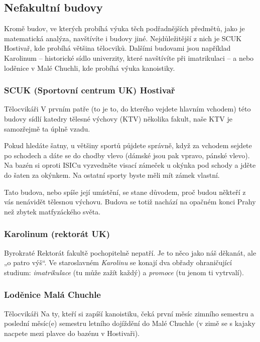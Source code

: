 \subsection{Nefakultní budovy}
Kromě budov, ve kterých probíhá výuka těch podřadnějších předmětů, jako je
matematická analýza, navštívíte i budovy jiné. Nejdůležitější z nich je SCUK
Hostivař, kde probíhá většina tělocviků. Dalšími budovami jsou například
Karolinum – historické sídlo univerzity, které navštívíte při imatrikulaci – a
nebo loděnice v Malé Chuchli, kde probíhá výuka kanoistiky.


\subsubsection{SCUK (Sportovní centrum UK) Hostivař}
{Tělocvikáři}
V prvním patře (to je to, do kterého vejdete hlavním vchodem) této budovy sídlí
katedry tělesné výchovy (KTV) několika fakult, naše KTV je samozřejmě ta úplně vzadu.

Pokud hledáte šatny, u většiny sportů půjdete správně, když za vchodem sejdete
po schodech a dáte se do chodby vlevo (dámské jsou pak vpravo, pánské vlevo). Na
bazén si oproti ISICu vyzvedněte visací zámeček u okýnka pod schody a jděte do
šaten za okýnkem. Na ostatní sporty byste měli mít zámek vlastní.

Tato budova, nebo spíše její umístění, se stane důvodem, proč budou někteří z
vás nenávidět tělesnou výchovu. Budova se totiž nachází na opačném konci Prahy
než zbytek matfyzáckého světa.


\subsubsection{Karolinum (rektorát UK)}
{Byrokraté}
Rektorát fakultě pochopitelně nepatří. Je to něco jako náš děkanát, ale „o patro
výš“. Ve staroslavném \textit{Karolinu} se konají dva obřady ohraničující
studium: \textit{imatrikulace} (tu může zažít každý) a \textit{promoce} (tu
jenom ti vytrvalí).


\subsubsection{Loděnice Malá Chuchle}
{Tělocvikáři}
Na ty, kteří si zapíší kanoistiku, čeká první měsíc zimního semestru a poslední
měsíc(e) semestru letního dojíždění do Malé Chuchle (v zimě se s kajaky nacpete
mezi plavce do bazénu v Hostivaři).